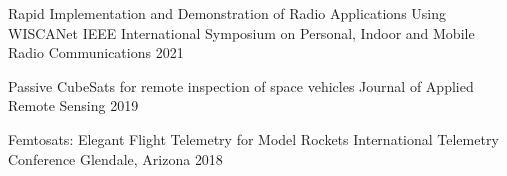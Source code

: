 
\begin{cvhonors}

    \cvhonor
    {Rapid Implementation and Demonstration of Radio Applications Using WISCANet}
    {IEEE International Symposium on Personal, Indoor and Mobile Radio Communications}
    {}
    {2021}

  \cvhonor
  {Passive CubeSats for remote inspection of space vehicles} %
  {Journal of Applied Remote Sensing} %
  {} %
    {2019} %

  \cvhonor
  {Femtosats: Elegant Flight Telemetry for Model Rockets} %
  {International Telemetry Conference} %
  {Glendale, Arizona} %
    {2018} %

\end{cvhonors}
